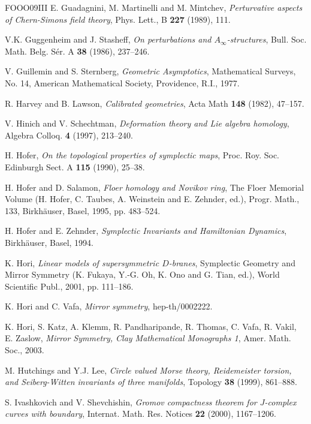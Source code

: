 \begin{thebibliography}{FOOO09III}
 E. Guadagnini, M. Martinelli and M. Mintchev, \emph{Perturvative aspects of Chern-Simons field theory}, Phys. Lett., B \textbf{227} (1989), 111.

 V.K. Guggenheim and J. Stasheff, \emph{On perturbations and \(A_\infty\)-structures}, Bull. Soc. Math. Belg. Sér. A \textbf{38} (1986), 237–246.

 V. Guillemin and S. Sternberg, \emph{Geometric Asymptotics}, Mathematical Surveys, No. 14, American Mathematical Society, Providence, R.I., 1977.

 R. Harvey and B. Lawson, \emph{Calibrated geometries}, Acta Math \textbf{148} (1982), 47–157.

 V. Hinich and V. Schechtman, \emph{Deformation theory and Lie algebra homology}, Algebra Colloq. \textbf{4} (1997), 213–240.

 H. Hofer, \emph{On the topological properties of symplectic maps}, Proc. Roy. Soc. Edinburgh Sect. A \textbf{115} (1990), 25–38.

 H. Hofer and D. Salamon, \emph{Floer homology and Novikov ring}, The Floer Memorial Volume (H. Hofer, C. Taubes, A. Weinstein and E. Zehnder, ed.), Progr. Math., 133, Birkhäuser, Basel, 1995, pp. 483–524.

 H. Hofer and E. Zehnder, \emph{Symplectic Invariants and Hamiltonian Dynamics}, Birkhäuser, Basel, 1994.

 K. Hori, \emph{Linear models of supersymmetric \(D\)-branes}, Symplectic Geometry and Mirror Symmetry (K. Fukaya, Y.-G. Oh, K. Ono and G. Tian, ed.), World Scientific Publ., 2001, pp. 111–186.

 K. Hori and C. Vafa, \emph{Mirror symmetry}, hep-th/0002222.

 K. Hori, S. Katz, A. Klemm, R. Pandharipande, R. Thomas, C. Vafa, R. Vakil, E. Zaslow, \emph{Mirror Symmetry, Clay Mathematical Monographs 1}, Amer. Math. Soc., 2003.

 M. Hutchings and Y.J. Lee, \emph{Circle valued Morse theory, Reidemeister torsion, and Seiberg-Witten invariants of three manifolds}, Topology \textbf{38} (1999), 861–888.

 S. Ivashkovich and V. Shevchishin, \emph{Gromov compactness theorem for \(J\)-complex curves with boundary}, Internat. Math. Res. Notices \textbf{22} (2000), 1167–1206.


\end{thebibliography}
